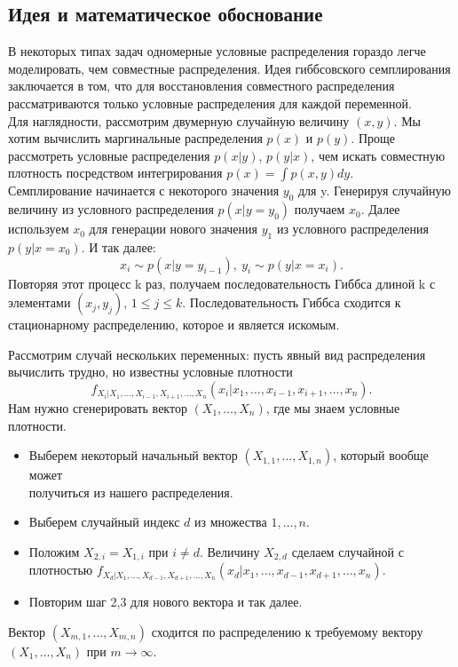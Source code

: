 \documentclass[14pt,a4paper]{article}
\begin{document}
\subsection{Идея и математическое обоснование}
В некоторых типах задач одномерные условные распределения гораздо легче моделировать, чем совместные распределения. Идея гиббсовского семплирования заключается в том, что для восстановления совместного распределения рассматриваются только условные распределения для каждой переменной. 
\\Для наглядности, рассмотрим двумерную случайную величину $(x,y)$. Мы хотим вычислить маргинальные распределения $p(x)$ и $p(y)$. Проще рассмотреть условные распределения $p(x|y)$, $p(y|x)$, чем искать совместную плотность посредством интегрирования $p(x) = \int p(x,y) dy$.
\\Семплирование начинается с некоторого значения $y_0$ для y. Генерируя случайную величину из условного распределения $p(x|y = y_0)$ получаем $x_0$. Далее используем $x_0$ для генерации нового значения $y_1$ из условного распределения $p(y|x = x_0)$. И так далее:
\begin{equation}
    x_i \sim  p(x|y = y_{i-1}), \ y_i \sim  p(y|x = x_i).
\end{equation}
Повторяя этот процесс k раз, получаем последовательность Гиббса длиной k с элементами $(x_j,y_j)$, $1 \leqslant j \leqslant k$. Последовательность Гиббса сходится к стационарному распределению, которое и является искомым.


Рассмотрим случай нескольких переменных: пусть явный вид распределения вычислить трудно, но известны условные плотности
\begin{equation}
    f_{X_i|X_1,\dots,X_{i-1},X_{i+1},\dots,X_n}({x_i|x_1,\dots,x_{i-1},x_{i+1},\dots,x_n}).
\end{equation}
Нам нужно сгенерировать вектор $(X_1,\dots,X_n)$, где мы знаем условные плотности.
\begin{itemize}
\item Выберем некоторый начальный вектор $(X_{1,1},\dots,X_{1,n})$, который вообще может \\получиться из нашего распределения.
\item Выберем случайный индекс $d$ из множества ${1,\dots,n}$.
\item Положим $X_{2,i} = X_{1,i}$ при $i \neq d$.
Величину $X_{2,d}$ сделаем случайной с плотностью $f_{X_d|X_1,\dots,X_{d-1},X_{d+1},\dots,X_n}({x_d|x_1,\dots,x_{d-1},x_{d+1},\dots,x_n})$.
\item Повторим шаг 2,3 для нового вектора и так далее.

\end{itemize}
Вектор $(X_{m,1},\dots,X_{m,n})$ сходится по распределению к требуемому вектору $(X_1,\dots,X_n)$ при $m\rightarrow\infty$.
\end{document}
